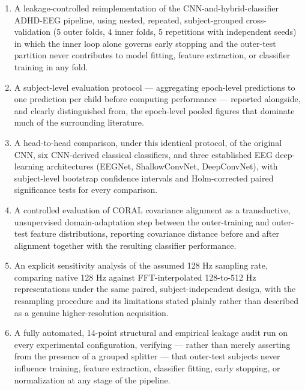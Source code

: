 \documentclass[a4paper,fleqn]{cas-sc}
\begin{document}
\begin{enumerate}

\item A leakage-controlled reimplementation of the CNN-and-hybrid-classifier ADHD-EEG pipeline, using nested, repeated, subject-grouped cross-validation (5 outer folds, 4 inner folds, 5 repetitions with independent seeds) in which the inner loop alone governs early stopping and the outer-test partition never contributes to model fitting, feature extraction, or classifier training in any fold.

\item A subject-level evaluation protocol --- aggregating epoch-level predictions to one prediction per child before computing performance --- reported alongside, and clearly distinguished from, the epoch-level pooled figures that dominate much of the surrounding literature.

\item A head-to-head comparison, under this identical protocol, of the original CNN, six CNN-derived classical classifiers, and three established EEG deep-learning architectures (EEGNet, ShallowConvNet, DeepConvNet), with subject-level bootstrap confidence intervals and Holm-corrected paired significance tests for every comparison.

\item A controlled evaluation of CORAL covariance alignment \cite{sun2016return} as a transductive, unsupervised domain-adaptation step between the outer-training and outer-test feature distributions, reporting covariance distance before and after alignment together with the resulting classifier performance.

\item An explicit sensitivity analysis of the assumed 128 Hz sampling rate, comparing native 128 Hz against FFT-interpolated 128-to-512 Hz representations under the same paired, subject-independent design, with the resampling procedure and its limitations stated plainly rather than described as a genuine higher-resolution acquisition.

\item A fully automated, 14-point structural and empirical leakage audit run on every experimental configuration, verifying --- rather than merely asserting from the presence of a grouped splitter --- that outer-test subjects never influence training, feature extraction, classifier fitting, early stopping, or normalization at any stage of the pipeline.

\end{enumerate}
\end{document}

